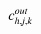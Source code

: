 

    \[\let\par\empty

    
{{{{\miitalic{c}}}\sb{{{\miitalic{h}}{\minormal{,}}{\miitalic{j}}{\minormal{,}}{\miitalic{k}}}}\sp{{\miitalic{out}}}}}


    \]

  